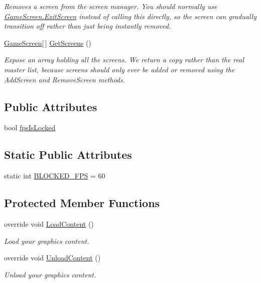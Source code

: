 \begin{DoxyCompactItemize}
\begin{DoxyCompactList}\small\item\em Removes a screen from the screen manager. You should normally use \hyperlink{classgearit_1_1xna_1_1_game_screen_ac0a09358bf75830432169413f4d1ae36}{Game\+Screen.\+Exit\+Screen} instead of calling this directly, so the screen can gradually transition off rather than just being instantly removed. \end{DoxyCompactList}\item 
\hyperlink{classgearit_1_1xna_1_1_game_screen}{Game\+Screen}\mbox{[}$\,$\mbox{]} \hyperlink{classgearit_1_1xna_1_1_screen_manager_ac27fbfb2051b797d886e65d4d5a2d722}{Get\+Screens} ()
\begin{DoxyCompactList}\small\item\em Expose an array holding all the screens. We return a copy rather than the real master list, because screens should only ever be added or removed using the Add\+Screen and Remove\+Screen methods. \end{DoxyCompactList}\end{DoxyCompactItemize}
\subsection*{Public Attributes}
\begin{DoxyCompactItemize}
\item 
bool \hyperlink{classgearit_1_1xna_1_1_screen_manager_af6bbd1b66b28ccafc90b86c0bc1828f9}{fps\+Is\+Locked}
\end{DoxyCompactItemize}
\subsection*{Static Public Attributes}
\begin{DoxyCompactItemize}
\item 
static int \hyperlink{classgearit_1_1xna_1_1_screen_manager_acae716d8c020785cf4691893dc0ed8b6}{B\+L\+O\+C\+K\+E\+D\+\_\+\+F\+P\+S} = 60
\end{DoxyCompactItemize}
\subsection*{Protected Member Functions}
\begin{DoxyCompactItemize}
\item 
override void \hyperlink{classgearit_1_1xna_1_1_screen_manager_a91a1529e82ec4e5d4f45e3ac067a0e78}{Load\+Content} ()
\begin{DoxyCompactList}\small\item\em Load your graphics content. \end{DoxyCompactList}\item 
override void \hyperlink{classgearit_1_1xna_1_1_screen_manager_a0890524258c2c8951a42d1e02079c8ec}{Unload\+Content} ()
\begin{DoxyCompactList}\small\item\em Unload your graphics content. \end{DoxyCompactList}\end{DoxyCompactItemize}
